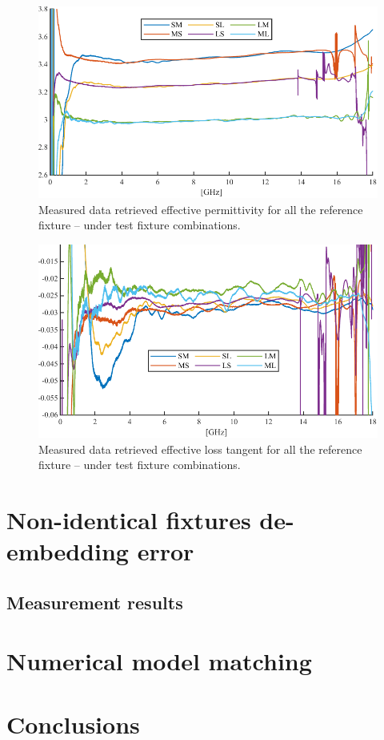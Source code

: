 \documentclass[11pt,a4paper]{article}
\begin{document}
    \begin{figure}[!h]
        \includegraphics[width=\textwidth]{epsimeas}
        \caption{Measured data retrieved effective permittivity for all the reference fixture -- under test fixture combinations.}
        \label{fig:epsilonmeas}
    \end{figure}
    \begin{figure}[!h]
        \includegraphics[width=\textwidth]{tandmeas}
        \caption{Measured data retrieved effective loss tangent for all the reference fixture -- under test fixture combinations.}
        \label{fig:tandmeas}
    \end{figure}


    \section{Non-identical fixtures de-embedding error}
    \label{sec:error}

    \subsection{Measurement results}
    \label{subsec:measure-error}


    \section{Numerical model matching}
    \label{sec:numerical-model-matching}


    \section{Conclusions}
    \label{sec:conclusion}


    \clearpage
    
    
\end{document}
